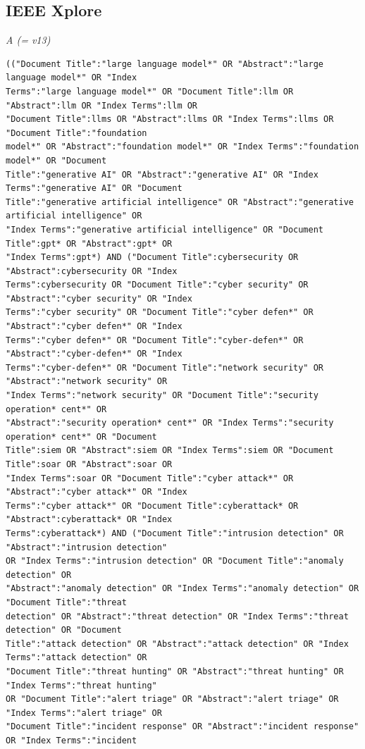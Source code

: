 \subsection*{IEEE Xplore}
\noindent\textit{A (= v13)}
\begin{lstlisting}
(("Document Title":"large language model*" OR "Abstract":"large language model*" OR "Index
Terms":"large language model*" OR "Document Title":llm OR "Abstract":llm OR "Index Terms":llm OR
"Document Title":llms OR "Abstract":llms OR "Index Terms":llms OR "Document Title":"foundation
model*" OR "Abstract":"foundation model*" OR "Index Terms":"foundation model*" OR "Document
Title":"generative AI" OR "Abstract":"generative AI" OR "Index Terms":"generative AI" OR "Document
Title":"generative artificial intelligence" OR "Abstract":"generative artificial intelligence" OR
"Index Terms":"generative artificial intelligence" OR "Document Title":gpt* OR "Abstract":gpt* OR
"Index Terms":gpt*) AND ("Document Title":cybersecurity OR "Abstract":cybersecurity OR "Index
Terms":cybersecurity OR "Document Title":"cyber security" OR "Abstract":"cyber security" OR "Index
Terms":"cyber security" OR "Document Title":"cyber defen*" OR "Abstract":"cyber defen*" OR "Index
Terms":"cyber defen*" OR "Document Title":"cyber-defen*" OR "Abstract":"cyber-defen*" OR "Index
Terms":"cyber-defen*" OR "Document Title":"network security" OR "Abstract":"network security" OR
"Index Terms":"network security" OR "Document Title":"security operation* cent*" OR
"Abstract":"security operation* cent*" OR "Index Terms":"security operation* cent*" OR "Document
Title":siem OR "Abstract":siem OR "Index Terms":siem OR "Document Title":soar OR "Abstract":soar OR
"Index Terms":soar OR "Document Title":"cyber attack*" OR "Abstract":"cyber attack*" OR "Index
Terms":"cyber attack*" OR "Document Title":cyberattack* OR "Abstract":cyberattack* OR "Index
Terms":cyberattack*) AND ("Document Title":"intrusion detection" OR "Abstract":"intrusion detection"
OR "Index Terms":"intrusion detection" OR "Document Title":"anomaly detection" OR
"Abstract":"anomaly detection" OR "Index Terms":"anomaly detection" OR "Document Title":"threat
detection" OR "Abstract":"threat detection" OR "Index Terms":"threat detection" OR "Document
Title":"attack detection" OR "Abstract":"attack detection" OR "Index Terms":"attack detection" OR
"Document Title":"threat hunting" OR "Abstract":"threat hunting" OR "Index Terms":"threat hunting"
OR "Document Title":"alert triage" OR "Abstract":"alert triage" OR "Index Terms":"alert triage" OR
"Document Title":"incident response" OR "Abstract":"incident response" OR "Index Terms":"incident

\end{lstlisting}
